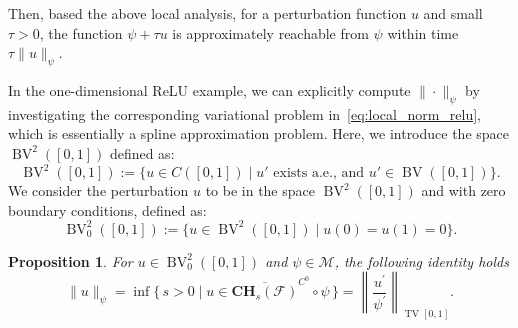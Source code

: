 \documentclass[12pt]{amsart}
\numberwithin{equation}{section}
\newtheorem{proposition}{Proposition}[section]
\theoremstyle{remark}
\newcommand{\ql}[1]{\texttt{\color{cyan} QL: \footnotesize #1}}
\begin{document}
Then, based the above local analysis, for a perturbation function $u$ and small $\tau>0$, the function $\psi + \tau u$ is approximately reachable from $\psi$ within time $\tau \|u\|_{\psi}$.



In the one-dimensional ReLU example, we can explicitly compute $\|\cdot\|_{\psi}$ by investigating the corresponding variational problem in~\eqref{eq:local_norm_relu}, which is essentially a spline approximation problem. Here, we introduce the space $\operatorname{BV}^2([0,1])$ defined as:
\begin{equation}
    \operatorname{BV}^2([0,1]) := \{u\in C([0,1]) \mid u' \text{ exists a.e., and } u' \in \operatorname{BV}([0,1])\}.
\end{equation}
We consider the perturbation $u$ to be in the space $\operatorname{BV}^2([0,1])$ and with zero boundary conditions, defined as:
\begin{equation}
    \operatorname{BV}^2_0([0,1]) := \{u\in \operatorname{BV}^2([0,1]) \mid  u(0)=u(1)=0\}.
\end{equation}

\begin{proposition}
    \label{prop:local_norm_relu}
        For $ u \in \operatorname{BV}_0^2([0,1])$ and $\psi\in \mathcal M$, the following identity holds
    \begin{equation}
       \|u\|_\psi =\inf\{\,s>0\mid u\in \overline{\mathbf{CH}_s(\mathcal F)}^{C^0}\circ \psi\,\}
        =\left\|\frac{u^\prime}{\psi^\prime}\right\|_{\operatorname{TV}[0,1]}.
    \end{equation}
\end{proposition}
\end{document}
